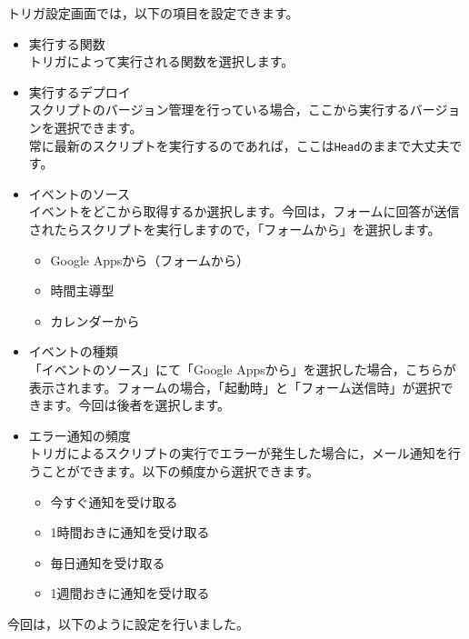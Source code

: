 \documentclass[uplatex,a4j]{jsarticle}
\begin{document}
トリガ設定画面では，以下の項目を設定できます。
\begin{itemize}
\item 実行する関数\\
トリガによって実行される関数を選択します。
\item 実行するデプロイ\\
スクリプトのバージョン管理を行っている場合，ここから実行するバージョンを選択できます。\\
常に最新のスクリプトを実行するのであれば，ここは\verb|Head|のままで大丈夫です。
\item イベントのソース\\
イベントをどこから取得するか選択します。今回は，フォームに回答が送信されたらスクリプトを実行しますので，「フォームから」を選択します。
\begin{itemize}
\item Google Appsから（フォームから）
\item 時間主導型
\item カレンダーから
\end{itemize}
\item イベントの種類\\
「イベントのソース」にて「Google Appsから」を選択した場合，こちらが表示されます。フォームの場合，「起動時」と「フォーム送信時」が選択できます。今回は後者を選択します。
\item エラー通知の頻度\\
トリガによるスクリプトの実行でエラーが発生した場合に，メール通知を行うことができます。以下の頻度から選択できます。
\begin{itemize}
\item 今すぐ通知を受け取る
\item 1時間おきに通知を受け取る
\item 毎日通知を受け取る
\item 1週間おきに通知を受け取る
\end{itemize}
\end{itemize}

今回は，以下のように設定を行いました。
\end{document}
